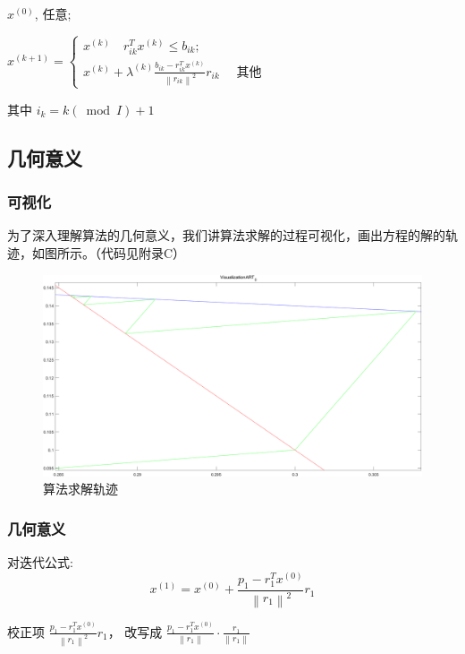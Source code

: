 \documentclass[hyperref]{ctexart}
\begin{document}
			$x^{(0)}$, 任意;
	
			$x^{(k+1)}=\left\{\begin{array}{c}x^{(k)} \quad r_{i k}^{T} x^{(k)} \leq b_{i k} ; \\ x^{(k)}+\lambda^{(k)} \frac{b_{i k}-r_{i k}^{T} x^{(k)}}{\left\|r_{i k}\right\|^{2}} r_{i k} \quad \text { 其他 }\end{array}\right.$

			其中 $i_{k}=k(\bmod I)+1$

		\subsection{几何意义}
			
			\subsubsection{可视化}
				为了深入理解算法的几何意义，我们讲算法求解的过程可视化，画出方程的解的轨迹，如图所示。（代码见附录C）
				\begin{figure}[ht!]
				\centering
				\includegraphics[width=120mm]{VisualizationART_0.png}
				\caption{算法求解轨迹 \label{算法求解轨迹图}}
				\end{figure}

			\subsubsection{几何意义}
				对迭代公式: 
				\begin{equation}
					x^{(1)}=x^{(0)}+\frac{p_{1}-r_{1}^{T} x^{(0)}}{\left\|r_{1}\right\|^{2}} r_{1}
				\end{equation}

				校正项 $\frac{p_{1}-r_{1}^{T} x^{(0)}}{\left\|r_{1}\right\|^{2}} r_{1}$，\;
				改写成 $\frac{p_{1}-r_{1}^{T} x^{(0)}}{\left\|r_{1}\right\|} \cdot \frac{r_{1}}{\left\|r_{1}\right\|}$
				
\end{document}
